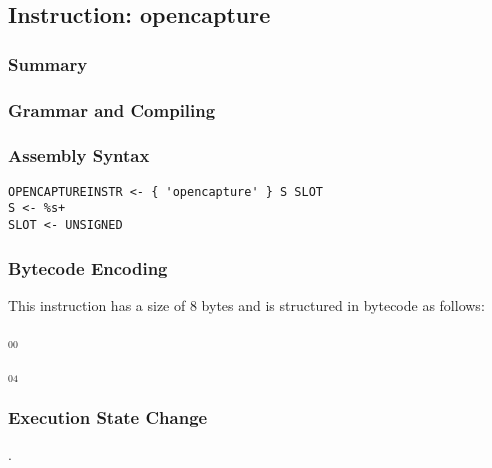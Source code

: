 \subsection{Instruction: opencapture}

\subsubsection{Summary}


\subsubsection{Grammar and Compiling}


\subsubsection{Assembly Syntax}

\begin{myquote}
\begin{verbatim}
OPENCAPTUREINSTR <- { 'opencapture' } S SLOT
S <- %s+
SLOT <- UNSIGNED
\end{verbatim}
\end{myquote}


\subsubsection{Bytecode Encoding}

This instruction has a size of 8 bytes and is structured in bytecode as follows:

$_{00}$\ 



$_{04}$\ 


\subsubsection{Execution State Change}

.



